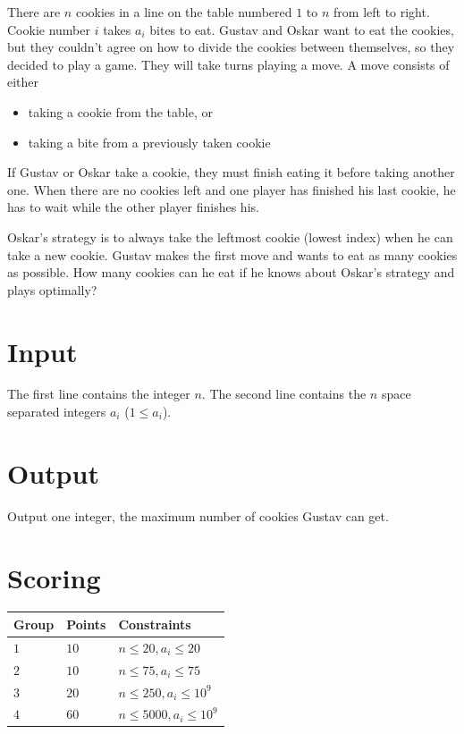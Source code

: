
\noindent There are $n$ cookies in a line on the table numbered $1$ to $n$ from left to right.
Cookie number $i$ takes $a_i$ bites to eat. Gustav and Oskar want to eat the cookies, but they couldn't agree on how to divide the cookies between themselves,
so they decided to play a game. They will take turns playing a move. A move consists of either
\begin{itemize}
  \item taking a cookie from the table, or
  \item taking a bite from a previously taken cookie
\end{itemize}

\noindent If Gustav or Oskar take a cookie, they must finish eating it before taking another one.
When there are no cookies left and one player has finished his last cookie, he has to wait while the other player finishes his.

Oskar's strategy is to always take the leftmost cookie (lowest index) when he can take a new cookie.
Gustav makes the first move and wants to eat as many cookies as possible. How many cookies can he eat if he knows about Oskar's strategy and plays optimally?

\section*{Input}
The first line contains the integer $n$.
The second line contains the $n$ space separated integers $a_i$ ($1 \leq a_i$).

\section*{Output}
Output one integer, the maximum number of cookies Gustav can get.

\section*{Scoring}

\noindent
\begin{tabular}{| l | l | l |}
\hline
Group & Points     & Constraints \\ \hline
$1$   & $10$       & $n \leq 20, a_i \leq 20$ \\ \hline
$2$   & $10$       & $n \leq 75, a_i \leq 75$ \\ \hline
$3$   & $20$       & $n \leq 250, a_i \leq 10^9$ \\ \hline
$4$   & $60$       & $n \leq 5000, a_i \leq 10^9$ \\ \hline
\end{tabular}

